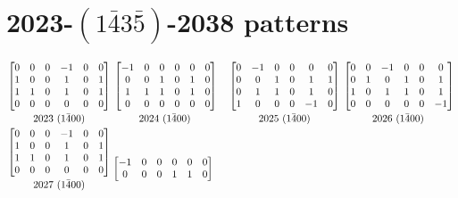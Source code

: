 \documentclass[12 pt]{article}%
\begin{document}
\section{2023-$(1\bar43\bar5)$-2038 patterns}

\small
\begin{align*}
  \begin{bmatrix}
    0 & 0 & 0 & -1 & 0 & 0 \\
    1 & 0 & 0 & 1 & 0 & 1 \\
    1 & 1 & 0 & 1 & 0 & 1 \\
    0 & 0 & 0 & 0 & 0 & 0 \\
  \end{bmatrix}
  \atop 2023 \,\, (1\bar400) &
  \begin{bmatrix}
    -1 & 0 & 0 & 0 & 0 & 0 \\
    0 & 0 & 1 & 0 & 1 & 0 \\
    1 & 1 & 1 & 0 & 1 & 0 \\
    0 & 0 & 0 & 0 & 0 & 0 \\
  \end{bmatrix}
  \atop 2024 \,\, (1\bar400) &
  \begin{bmatrix}
    0 & -1 & 0 & 0 & 0 & 0 \\
    0 & 0 & 1 & 0 & 1 & 1 \\
    0 & 1 & 1 & 0 & 1 & 0 \\
    1 & 0 & 0 & 0 & -1 & 0 \\
  \end{bmatrix}
  \atop 2025 \,\, (1\bar400) &
  \begin{bmatrix}
    0 & 0 & -1 & 0 & 0 & 0 \\
    0 & 1 & 0 & 1 & 0 & 1 \\
    1 & 0 & 1 & 1 & 0 & 1 \\
    0 & 0 & 0 & 0 & 0 & -1 \\
  \end{bmatrix}
  \atop 2026 \,\, (1\bar400) \\
  \begin{bmatrix}
    0 & 0 & 0 & -1 & 0 & 0 \\
    1 & 0 & 0 & 1 & 0 & 1 \\
    1 & 1 & 0 & 1 & 0 & 1 \\
    0 & 0 & 0 & 0 & 0 & 0 \\
  \end{bmatrix}
  \atop 2027 \,\, (1\bar400) &
  \begin{bmatrix}
    -1 & 0 & 0 & 0 & 0 & 0 \\
    0 & 0 & 0 & 1 & 1 & 0 \\

\end{bmatrix}
\end{align*}
\end{document}
